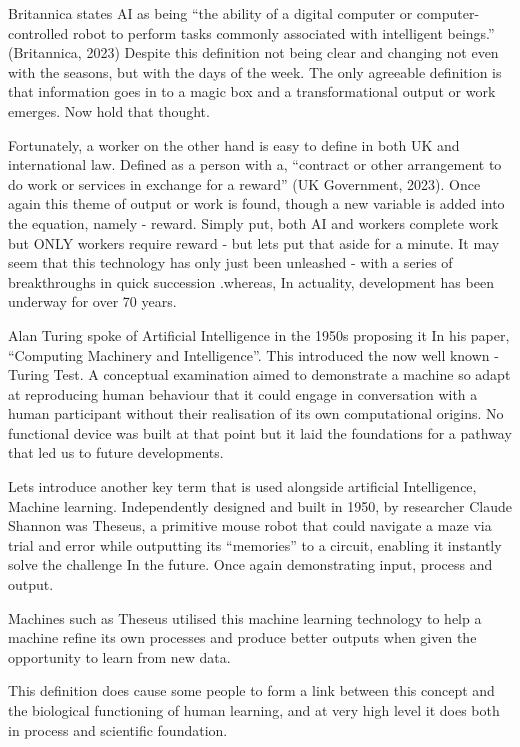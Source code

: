 Britannica states AI as being “the ability of a digital computer or computer-controlled robot to perform tasks commonly associated with intelligent beings.” (Britannica, 2023) Despite this definition not being clear and changing not even with the seasons, but with the days of the week. The only agreeable definition is that information goes in to a magic box and a transformational output or work emerges. Now hold that thought.

Fortunately, a worker on the other hand is easy to define in both UK and international law. Defined as a person with a, “contract or other arrangement to do work or services in exchange for a reward” (UK Government, 2023). Once again this theme of output or work is found, though a new variable is added into the equation, namely - reward. Simply put, both AI and workers complete work but ONLY workers require reward - but lets put that aside for a minute.
It may seem that this technology has only just been unleashed - with a series of breakthroughs in quick succession .whereas, In actuality, development has been underway for over 70 years.

Alan Turing spoke of Artificial Intelligence in the 1950s proposing it In his paper, “Computing Machinery and Intelligence”. This introduced the now well known -Turing Test. A conceptual examination aimed to demonstrate a machine so adapt at reproducing human behaviour that it could engage in conversation with a human participant without their realisation of its own computational origins. No functional device was built at that point but it laid the foundations for a pathway that led us to future developments.

Lets introduce another key term that is used alongside artificial Intelligence, Machine learning. Independently designed and built in 1950, by researcher Claude Shannon was Theseus, a primitive mouse robot that could navigate a maze via trial and error while outputting its “memories” to a circuit, enabling it instantly solve the challenge In the future. Once again demonstrating input, process and output.

Machines such as Theseus utilised this machine learning technology to help a machine refine its own processes and produce better outputs when given the opportunity to learn from new data.

This definition does cause some people to form a link between this concept and the biological functioning of human learning, and at very high level it does both in process and scientific foundation.

